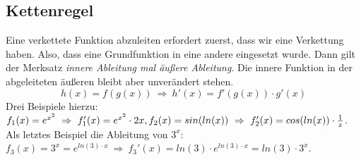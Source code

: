 \subsection{Kettenregel}
	Eine verkettete Funktion abzuleiten erfordert zuerst, dass wir eine Verkettung
	haben. Also, dass eine Grundfunktion in eine andere eingesetzt wurde. Dann gilt
	der Merksatz \emph{innere Ableitung mal äußere Ableitung}. Die innere Funktion
	in der abgeleiteten äußeren bleibt aber unverändert stehen.
	\[h(x)=f(g(x))\ \Rightarrow\ h'(x)=f'(g(x))\cdot g'(x)\]
	Drei Beispiele hierzu: \(f_1(x)=e^{x^2}\ \Rightarrow\ f_1'(x)=e^{x^2}\cdot
	2x,\\
	f_2(x)=sin(ln(x))\ \Rightarrow\ f_2'(x)=cos(ln(x))\cdot \frac{1}{x}\).\\
	Als letztes Beispiel die Ableitung von \(3^x\): \(f_3(x)=3^x=e^{ln(3)\cdot x}\
	\Rightarrow\ f_3'(x)=ln(3)\cdot e^{ln(3)\cdot x}=ln(3)\cdot 3^x\).
